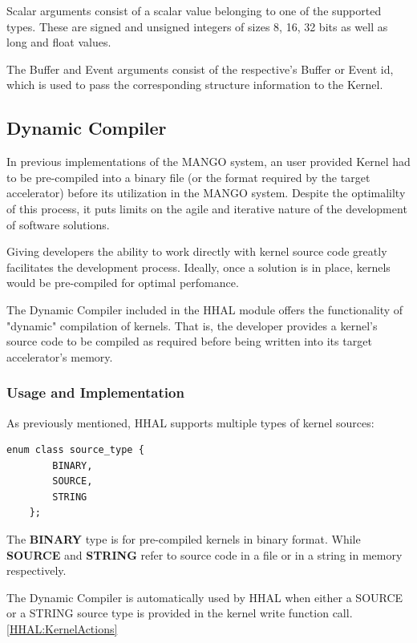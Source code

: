 Scalar arguments consist of a scalar value belonging to one of the supported types. These are signed and unsigned integers of sizes 8, 16, 32 bits as well as long and float values.

The Buffer and Event arguments consist of the respective's Buffer or Event id, which is used to pass the corresponding structure information to the Kernel.

\subsection{Dynamic Compiler} \label{HHAL:DynamicCompiler}

In previous implementations of the MANGO system, an user provided Kernel had to be pre-compiled into a binary file (or the format required by the target accelerator) before its utilization in the MANGO system. Despite the optimalilty of this process, it puts limits on the agile and iterative nature of the development of software solutions.

Giving developers the ability to work directly with kernel source code greatly facilitates the development process. Ideally, once a solution is in place, kernels would be pre-compiled for optimal perfomance.

The Dynamic Compiler included in the HHAL module offers the functionality of "dynamic" compilation of kernels. That is, the developer provides a kernel's source code to be compiled as required before being written into its target accelerator's memory.

\subsubsection{Usage and Implementation}

As previously mentioned, HHAL supports multiple types of kernel sources: 

\begin{lstlisting}[style=CStyle, caption=HHAL API - Kernel source types]
    enum class source_type {
        BINARY,
        SOURCE,
        STRING
    };
\end{lstlisting}

The \textbf{BINARY} type is for pre-compiled kernels in binary format. While \textbf{SOURCE} and \textbf{STRING} refer to source code in a file or in a string in memory respectively.

The Dynamic Compiler is automatically used by HHAL when either a SOURCE or a STRING source type is provided in the kernel write function call. \ref{HHAL:KernelActions}

